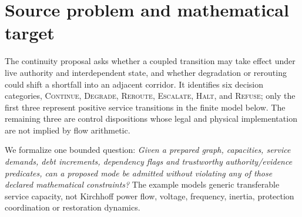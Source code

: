 \documentclass[11pt,letterpaper]{article}
\theoremstyle{definition}\newtheorem{definition}[theorem]{Definition}\newtheorem{example}[theorem]{Example}
\theoremstyle{remark}\newtheorem{remark}[theorem]{Remark}
\begin{document}
\section{Source problem and mathematical target}
The continuity proposal asks whether a coupled transition may take effect under live authority and interdependent state, and whether degradation or rerouting could shift a shortfall into an adjacent corridor. It identifies six decision categories, \textsc{Continue}, \textsc{Degrade}, \textsc{Reroute}, \textsc{Escalate}, \textsc{Halt}, and \textsc{Refuse}; only the first three represent positive service transitions in the finite model below. The remaining three are control dispositions whose legal and physical implementation are not implied by flow arithmetic.

We formalize one bounded question: \emph{Given a prepared graph, capacities, service demands, debt increments, dependency flags and trustworthy authority/evidence predicates, can a proposed mode be admitted without violating any of those declared mathematical constraints?} The example models generic transferable service capacity, not Kirchhoff power flow, voltage, frequency, inertia, protection coordination or restoration dynamics.
\end{document}
